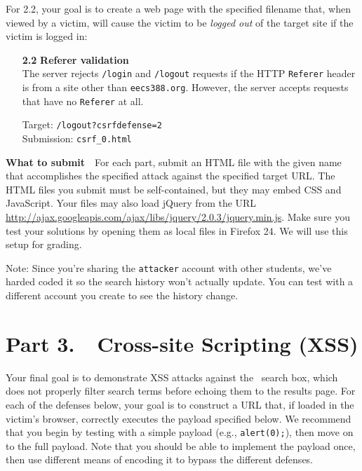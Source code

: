\documentclass[letterpaper,12pt]{article}
\begin{document}
{For 2.2, your goal is to create a web page with the specified filename that, when viewed by a victim, will cause the victim to be \emph{logged out} of the target site if the victim is logged in:

\begin{enumerate}

\item[\bf 2.2] \textbf{Referer validation}\\
The server rejects \texttt{/login} and \texttt{/logout} requests if the HTTP \texttt{Referer} header is from a site other than \texttt{eecs388.org}. However, the server accepts requests that have no \texttt{Referer} at all.
\smallskip

{Target: \texttt{/logout?csrfdefense=2}}\\
{Submission: \texttt{csrf\_0.html}}

\fi

\end{enumerate}

\textbf{What to submit}\ \ For each part, submit an HTML file with the given name that accomplishes the specified attack against the specified target URL.  The HTML files you submit must be self-contained, but they may embed CSS and JavaScript.  Your files may also load jQuery from the URL \url{http://ajax.googleapis.com/ajax/libs/jquery/2.0.3/jquery.min.js}.  Make sure you test your solutions by opening them as local files in Firefox 24.  We will use this setup for grading.

\medskip

Note: Since you're sharing the \texttt{attacker} account with other students, we've harded coded it so the search history won't actually update.  You can test with a different account you create to see the history change.

\newpage

\section*{Part 3.\ \ Cross-site Scripting (XSS)}

Your final goal is to demonstrate XSS attacks against the \bungle\ search box, which does not properly filter search terms before echoing them to the results page.  For each of the defenses below, your goal is to construct a URL that, if loaded in the victim's browser, correctly executes the payload specified below.  We recommend that you begin by testing with a simple payload (e.g., \texttt{alert(0);}), then move on to the full payload.  Note that you should be able to implement the payload once, then use different means of encoding it to bypass the different defenses.

}
\end{document}

